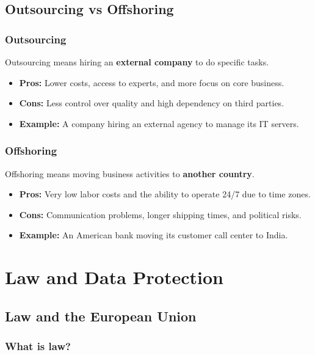 \documentclass[12pt,a4paper]{report}
\begin{document}
\section{Outsourcing vs Offshoring}

\subsection{Outsourcing}
Outsourcing means hiring an \textbf{external company} to do specific tasks.
\begin{itemize}
    \item \textbf{Pros:} Lower costs, access to experts, and more focus on core business.
    \item \textbf{Cons:} Less control over quality and high dependency on third parties.
    \item \textbf{Example:} A company hiring an external agency to manage its IT servers.
\end{itemize}

\subsection{Offshoring}
Offshoring means moving business activities to \textbf{another country}.
\begin{itemize}
    \item \textbf{Pros:} Very low labor costs and the ability to operate 24/7 due to time zones.
    \item \textbf{Cons:} Communication problems, longer shipping times, and political risks.
    \item \textbf{Example:} An American bank moving its customer call center to India.
\end{itemize}
\chapter{Law and Data Protection}

\hypertarget{law-and-the-european-union}{%
\section{Law and the European Union}\label{law-and-the-european-union}}

\hypertarget{what-is-law}{%
\subsection{What is law?}\label{what-is-law}}
\end{document}
